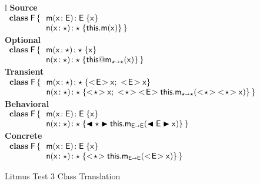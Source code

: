 \documentclass[runnningheads]{tex/llncs}
\begin{document}
\begin{figure}
  \begin{tabular}{l}
    {\scriptsize\bf{Source}} \\
\(
\begin{array}{l@{\,}l}
\Class{\xt F}{}{&\Mdef\m\x{\xt E}{\xt E}\x \\
                &\Mdef\n\x\any\any{\Call\this\m\x}} \\
\end{array}
\) \\
    {\scriptsize\bf{Optional}} \\ 
\(
\begin{array}{l@{\,}l}
\Class{\xt F}{}{&\Mdef\m\x{\any}{\any}\x \\
                &\Mdef\n\x\any\any{\DynCall\this\m\x}} \\
\end{array}
\) \\
    {\scriptsize\bf{Transient}} \\
\(
\begin{array}{l@{\,}l}
\Class{\xt F}{}{&\Mdef\m\x\any\any{\idbody{\xt E}} \\
                &\Mdef\n\x\any\any{\SubCast{\any}{\x}\sspce 
                \SubCast{\any}{\SubCast{\xt E}{\KCall\this\m{\SubCast\any{\SubCast\any\x}}\any\any}}}} \\
\end{array}
\)\\
    {\scriptsize\bf{Behavioral}} \\
\(
\begin{array}{l@{\,}l}
\Class{\xt F}{}{&\Mdef\m\x{\xt E}{\xt E}\x \\
                &\Mdef\n\x\any\any{\BehCast\any{\KCall\this\m{\BehCast{\xt E}\x}{\xt E}{\xt E}}}} \\
\end{array}
\) \\
    {\scriptsize\bf{Concrete}} \\
\(
\begin{array}{l@{\,}l}
\Class{\xt F}{}{&\Mdef\m\x{\xt E}{\xt E}\x \\
                &\Mdef\n\x\any\any{\SubCast\any{\KCall\this\m{\SubCast{\xt E}\x}{\xt E}{\xt E}}}} \\
\end{array}
\) \\
  \end{tabular}
  
  \caption{Litmus Test 3 Class Translation}
  \label{fig:l3trans}
\end{figure}
\end{document}
